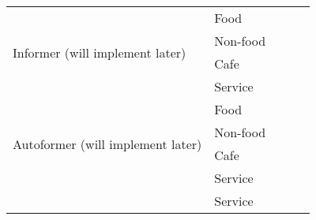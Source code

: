 \documentclass{article}
\begin{document}
\begin{table}[htbp]
\begin{tabular}{llccc}
\midrule
\multirow{4}{*}{Informer (will implement later)} 
  & Food       &  \\
  & Non-food   &  \\
  & Cafe       &  \\
  & Service    &  \\

\midrule
\multirow{4}{*}{Autoformer (will implement later)} 
  & Food       &  \\
  & Non-food   &  \\
  & Cafe       &  \\
  & Service    &  \\

  & Service    &  \\

\bottomrule
\end{tabular}
\label{tab:model-performance}
\end{table}


\end{document}

